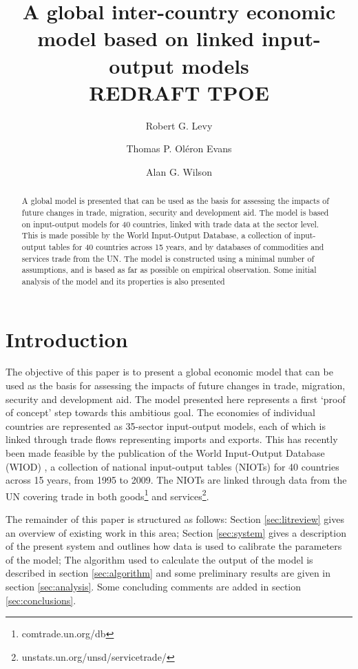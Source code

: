 \documentclass[a4paper]{article}
\title{A global inter-country economic model based on linked input-output models \\ REDRAFT TPOE}
\author[*]{Robert G. Levy}
\author[**]{Thomas P. Ol\'{e}ron Evans}
\author[*]{Alan G. Wilson}
\affil[*]{Centre for Advanced Spatial Analysis, UCL Bartlett Faculty of the Built Environment,
90 Tottenham Court Road, London W1T 4TJ, UK}
\affil[**]{Department of Mathematics, University College London, Gower Street, London WC1E 6BT, UK}
\begin{document}
\maketitle

\begin{abstract}
A global model is presented that can be used as the basis for assessing the impacts of future changes in trade, migration, security and development aid.
The model is based on input-output models for 40 countries, linked with trade data at the sector level.
This is made possible by the World Input-Output Database, a collection of input-output tables for 40 countries across 15 years, and by databases of commodities and services trade from the UN.
The model is constructed using a minimal number of assumptions, and is based as far as possible on empirical observation.
Some initial analysis of the model and its properties is also presented
\end{abstract}

\section{Introduction}
The objective of this paper is to present a global economic model that can be used as the basis for assessing the impacts of future changes in trade, migration, security and development aid.
The model presented here represents a first `proof of concept' step towards this ambitious goal.
The economies of individual countries are represented as 35-sector input-output models, each of which is linked through trade flows representing imports and exports.
This has recently been made feasible by the publication of the World Input-Output Database (WIOD) \parencite{timmer_world_2012}, a collection of national input-output tables (NIOTs) for 40 countries across 15 years, from 1995 to 2009.
The NIOTs are linked through data from the UN covering trade in both goods\footnote{comtrade.un.org/db} and services\footnote{unstats.un.org/unsd/servicetrade/}.

The remainder of this paper is structured as follows: 
Section \ref{sec:litreview} gives an overview of existing work in this area;
Section \ref{sec:system} gives a description of the present system and outlines how data is used to calibrate the parameters of the model;
The algorithm used to calculate the output of the model is described in section \ref{sec:algorithm} and some preliminary results are given in section \ref{sec:analysis}.
Some concluding comments are added in section \ref{sec:conclusions}.
\end{document}

